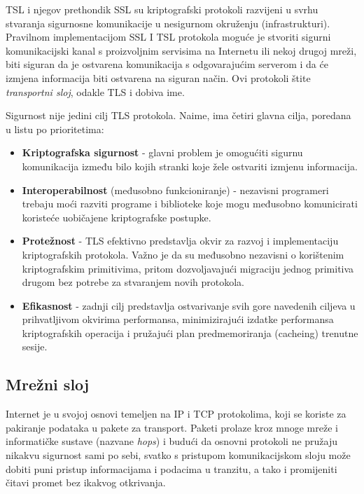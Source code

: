 \documentclass[times, utf8, diplomski]{fer}
\begin{document}
\medskip

TSL i njegov prethondik SSL su kriptografski protokoli razvijeni u svrhu stvaranja sigurnosne komunikacije u nesigurnom okruženju (infrastrukturi). Pravilnom implementacijom SSL I TSL protokola moguće je stvoriti sigurni komunikacijski kanal s proizvoljnim servisima na Internetu ili nekoj drugoj mreži, biti siguran da je ostvarena komunikacija s odgovarajućim serverom i da će izmjena informacija biti ostvarena na siguran način. Ovi protokoli štite \textit{transportni sloj}, odakle TLS i dobiva ime.

\medskip

Sigurnost nije jedini cilj TLS protokola. Naime, ima četiri glavna cilja, poredana u listu po prioritetima:

\begin{itemize}
\item \textbf{Kriptografska sigurnost} - glavni problem je omogućiti sigurnu komunikacija između bilo kojih stranki koje žele ostvariti izmjenu informacija.

\item \textbf{Interoperabilnost} (međusobno funkcioniranje) - nezavisni programeri trebaju moći razviti programe i biblioteke koje mogu međusobno komunicirati koristeće uobičajene kriptografske postupke.

\item \textbf{Protežnost} - TLS efektivno predstavlja okvir za razvoj i implementaciju kriptografskih protokola. Važno je da su međusobno nezavisni o korištenim kriptografskim primitivima, pritom dozvoljavajući migraciju jednog primitiva drugom bez potrebe za stvaranjem novih protokola.

\item \textbf{Efikasnost} - zadnji cilj predstavlja ostvarivanje svih gore navedenih ciljeva u prihvatljivom okvirima performansa, minimizirajući izdatke performansa kriptografskih operacija i pružajući plan predmemoriranja (cacheing) trenutne sesije. 
\end{itemize}


\subsection{Mrežni sloj}
Internet je u svojoj osnovi temeljen na IP i TCP protokolima, koji se koriste za pakiranje  podataka u pakete za transport. Paketi prolaze kroz mnoge mreže i informatičke sustave (nazvane \textit{hops}) i budući da osnovni protokoli ne pružaju nikakvu sigurnost sami po sebi, svatko s pristupom komunikacijskom sloju može dobiti puni pristup informacijama i podacima u tranzitu, a tako i promijeniti čitavi promet bez ikakvog otkrivanja.
\end{document}
